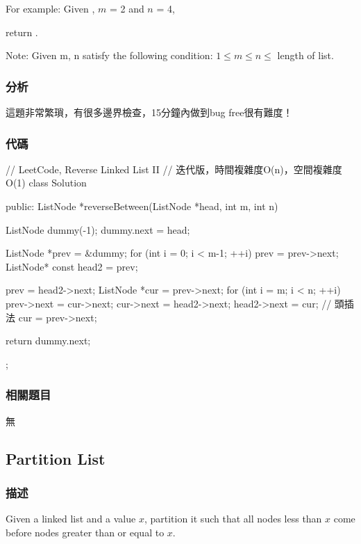 For example:
Given , $m$ = 2 and $n$ = 4,

return .

Note:
Given m, n satisfy the following condition:
$1 \leq m \leq  n \leq $ length of list.


\subsubsection{分析}
這題非常繁瑣，有很多邊界檢查，15分鐘內做到bug free很有難度！


\subsubsection{代碼}
\begin{Code}
// LeetCode, Reverse Linked List II
// 迭代版，時間複雜度O(n)，空間複雜度O(1)
class Solution {
public:
    ListNode *reverseBetween(ListNode *head, int m, int n) {
        ListNode dummy(-1);
        dummy.next = head;

        ListNode *prev = &dummy;
        for (int i = 0; i < m-1; ++i)
            prev = prev->next;
        ListNode* const head2 = prev;

        prev = head2->next;
        ListNode *cur = prev->next;
        for (int i = m; i < n; ++i) {
            prev->next = cur->next;
            cur->next = head2->next;
            head2->next = cur;  // 頭插法
            cur = prev->next;
        }

        return dummy.next;
    }
};
\end{Code}


\subsubsection{相關題目}

\begindot
\item 無
\myenddot


\subsection{Partition List}
\label{sec:partition-list}


\subsubsection{描述}
Given a linked list and a value $x$, partition it such that all nodes less than $x$ come before nodes greater than or equal to $x$.

